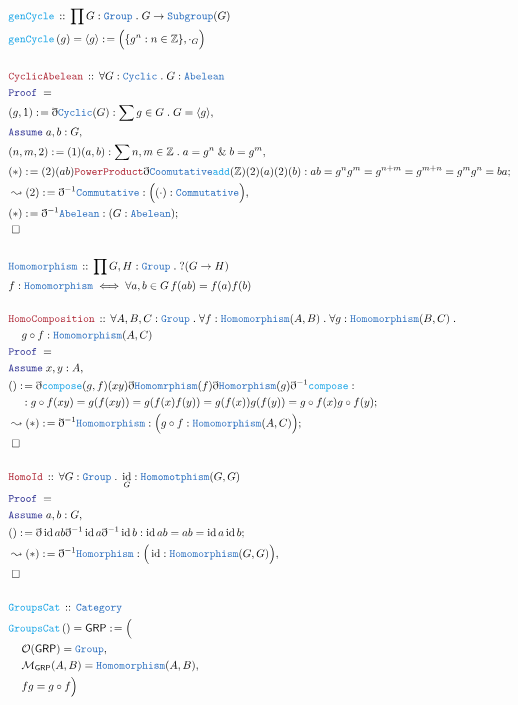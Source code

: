 \documentclass[12pt]{scrartcl}
\newcommand{\TYPE}[1]{\textcolor{NavyBlue}{\mathtt{#1}}}
\newcommand{\FUNC}[1]{\textcolor{Cerulean}{\mathtt{#1}}}
\newcommand{\LOGIC}[1]{\textcolor{Blue}{\mathtt{#1}}}
\newcommand{\THM}[1]{\textcolor{Maroon}{\mathtt{#1}}}
\renewcommand{\.}{\; . \;}
\newcommand{\de}{: \kern 0.1pc =}
\newcommand{\Act}[1]{\left( #1 \right)}
\newcommand{\Theorem}[2]{& \THM{#1} \, :: \, #2 \\ & \Proof = \\ }
\newcommand{\DeclareType}[2]{& \TYPE{#1} \, :: \, #2 \\}
\newcommand{\DefineType}[3]{& #1 : \TYPE{#2} \iff #3 \\}
\newcommand{\DeclareFunc}[2]{& \FUNC{#1} \, :: \, #2 \\}
\newcommand{\DefineNamedFunc}[4]{&  \FUNC{#1}\Act{#2} = #3 \de #4 \\}
\newcommand{\NewLine}{\\ & \kern 1pc}
\newcommand{\Page}[1]{ \begin{align*} #1 \end{align*}   }
\newcommand{ \bd }{ \ByDef }
\renewcommand{\And}{\; \& \;}
\newcommand{\Int}{\mathbb{Z} }
\DeclareMathOperator*{\id}{id}
\newcommand{\Cat}{\TYPE{Category}}
\newcommand{\Say}[3]{& #1 \de #2 : #3, \\}
\newcommand{\Conclude}[3]{& #1 \de #2 : #3; \\}
\newcommand{\Derive}[3]{& \leadsto #1 \de #2 : #3, \\}
\newcommand{\DeriveConclude}[3]{& \leadsto #1 \de #2 : #3 ; \\}
\newcommand{\Assume}[2]{& \LOGIC{Assume} \; #1 : #2, \\}
\newcommand{\QED}{\; \square}
\newcommand{\EndProof}{& \QED \\}
\newcommand{\ByDef}{\eth}
\newcommand{\Proof}{\LOGIC{Proof} \; }
\newcommand{\Group}{\TYPE{Group}}
\begin{document}
\Page{
	\DeclareFunc{genCycle}{\prod G : \Group \. G \to \TYPE{Subgroup}(G)}
	\DefineNamedFunc{genCycle}{g}{\langle g \rangle}{ \Big( \{ g^n : n \in \Int \}, \cdot_G \Big)}
	\\
	\Theorem{CyclicAbelean}{\forall G : \TYPE{Cyclic} \. G : \TYPE{Abelean}}
	\Say{(g,1)}{\bd \TYPE{Cyclic}(G) }{ \sum g \in G \. G = \langle g \rangle}
	\Assume{a,b}{G}
	\Say{(n,m,2)}{(1)(a,b)}{\sum n,m \in \Int \. a = g^n \And b = g^m}
	\Conclude{(*)}{(2)(ab)\THM{PowerProduct}\bd \TYPE{Coomutative}{\FUNC{add}(\Int)}(2)(a)(2)(b)}
	{ ab = g^ng^m = g^{n + m} = g^{m + n} = g^m g^n = ba  }
	\Derive{(2)}{\bd^{-1}\TYPE{Commutative}}{ \Big((\cdot) : \TYPE{Commutative}\Big) }
	\Conclude{(*)}{\bd^{-1}\TYPE{Abelean}}{(G : \TYPE{Abelean})}
	\EndProof
	\\
	\DeclareType{Homomorphism}{\prod G,H : \Group \. ?(G \to H) }
	\DefineType{f}{Homomorphism}{\forall a,b \in G \, f(ab) = f(a)f(b)}
	\\
	\Theorem{HomoComposition}{\forall A,B,C : \Group \. \forall f : \TYPE{Homomorphism}(A,B) \. 
	    \forall g : \TYPE{Homomorphism}(B,C) \. \NewLine g \circ f : \TYPE{Homomorphism}(A,C)}
	\Assume{x,y}{A}
	\Conclude{()}{ \bd \FUNC{compose}(g,f)(xy)\bd \TYPE{Homomrphism}(f) \bd \TYPE{Homorphism}(g) \bd^{-1} \FUNC{compose}}
	{
		\NewLine :
		g \circ f(xy) = g( f(xy) )= g( f(x)f(y)) = g(f(x))g(f(y)) = g \circ f(x) g \circ f(y) }
	\DeriveConclude{(*)}{\bd^{-1} \TYPE{Homomorphism}}{\Big(g \circ f : \TYPE{Homomorphism}(A,C)\Big)}
	\EndProof
	\\
	\Theorem{HomoId}{\forall G : \Group \. \id_G : \TYPE{Homomotphism}(G,G)}
	\Assume{a,b}{G}
	\Conclude{()}{\bd \id ab \bd^{-1} \id a \bd^{-1} \id b}{ \id ab = ab =\id a \id b }
	\Derive{(*)}{\bd^{-1} \TYPE{Homorphism}}{\Big(\id : \TYPE{Homomorphism}(G,G) \Big) }
	\EndProof
	\\
	\DeclareFunc{GroupsCat}{\Cat}
	\DefineNamedFunc{GroupsCat}{}{\mathsf{GRP}}{ \Big(\NewLine 
		  \mathcal{O}(\mathsf{GRP}) = \Group,  \NewLine
		  \mathcal{M}_{\mathsf{GRP}}(A,B) = \TYPE{Homomorphism}(A,B), \NewLine
		  fg = g \circ f\Big)
	}
}
\end{document}
